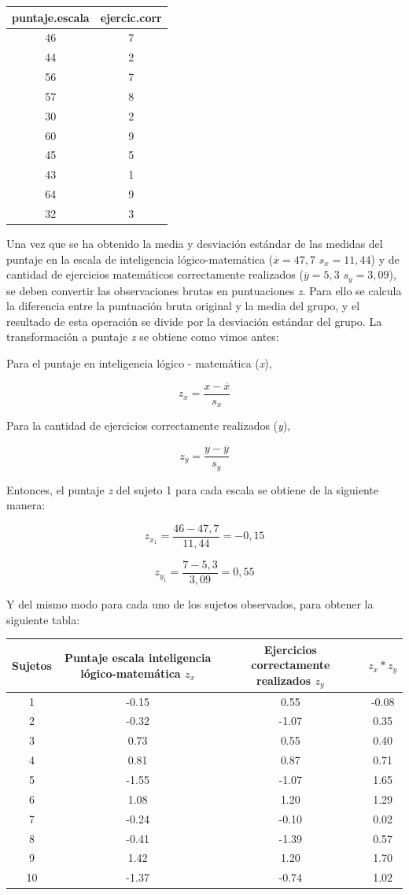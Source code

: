 \documentclass[]{book}
\begin{document}
\begin{longtable}[]{@{}cc@{}}
\toprule
puntaje.escala & ejercic.corr\tabularnewline
\midrule
\endhead
46 & 7\tabularnewline
44 & 2\tabularnewline
56 & 7\tabularnewline
57 & 8\tabularnewline
30 & 2\tabularnewline
60 & 9\tabularnewline
45 & 5\tabularnewline
43 & 1\tabularnewline
64 & 9\tabularnewline
32 & 3\tabularnewline
\bottomrule
\end{longtable}

Una vez que se ha obtenido la media y desviación estándar de las medidas
del puntaje en la escala de inteligencia lógico-matemática
(\(\overline{x} = 47,7\) \(s_{x} = 11,44\)) y de cantidad de ejercicios
matemáticos correctamente realizados
(\(\overline{y} = 5,3\) \(s_{y} = 3,09\)), se deben convertir las
observaciones brutas en puntuaciones \emph{z}. Para ello se calcula la
diferencia entre la puntuación bruta original y la media del grupo, y el
resultado de esta operación se divide por la desviación estándar del
grupo. La transformación a puntaje \emph{z} se obtiene como vimos antes:

Para el puntaje en inteligencia lógico - matemática (\emph{x}),

\[z_{x} = \frac{x - \overline{x}}{s_{x}}\]

Para la cantidad de ejercicios correctamente realizados (\emph{y}),

\[z_{y} = \frac{y - \overline{y}}{s_{y}}\]

Entonces, el puntaje \emph{z} del sujeto 1 para cada escala se obtiene de la siguiente manera:

\[z_{x_{1}} = \frac{46 - 47,7}{11,44} = - 0,15\]

\[z_{y_{1}} = \frac{7 - 5,3}{3,09} = 0,55\]

Y del mismo modo para cada uno de los sujetos observados, para obtener la siguiente tabla:

\begin{longtable}[]{@{}cccc@{}}
\toprule
Sujetos & Puntaje escala inteligencia lógico-matemática \(z_{x}\) & Ejercicios correctamente realizados \(z_{y}\) & \(z_{x}*z_{y}\)\tabularnewline
\midrule
\endhead
1 & -0.15 & 0.55 & -0.08\tabularnewline
2 & -0.32 & -1.07 & 0.35\tabularnewline
3 & 0.73 & 0.55 & 0.40\tabularnewline
4 & 0.81 & 0.87 & 0.71\tabularnewline
5 & -1.55 & -1.07 & 1.65\tabularnewline
6 & 1.08 & 1.20 & 1.29\tabularnewline
7 & -0.24 & -0.10 & 0.02\tabularnewline
8 & -0.41 & -1.39 & 0.57\tabularnewline
9 & 1.42 & 1.20 & 1.70\tabularnewline
10 & -1.37 & -0.74 & 1.02\tabularnewline
\bottomrule
\end{longtable}
\end{document}
